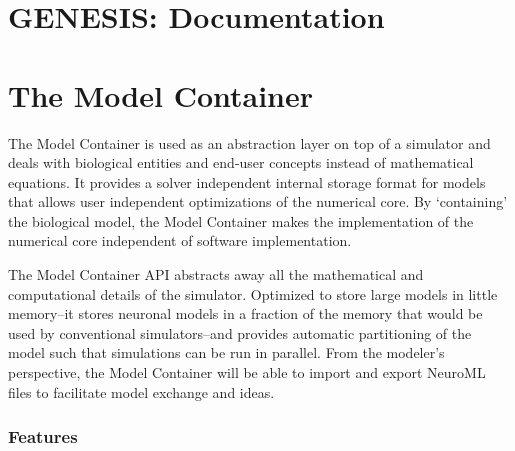 \documentclass[12pt]{article}
\begin{document}
\section*{GENESIS: Documentation}

\section*{The Model Container}

The Model Container is used as an abstraction layer on top of a simulator and deals with biological entities and end-user concepts instead of mathematical equations. It provides a solver independent internal storage format for models that allows user independent optimizations of the numerical core. By `containing' the biological model, the Model Container makes the implementation of the numerical core independent of software implementation.

The Model Container API abstracts away all the mathematical and computational details of the simulator. Optimized to store large models in little memory--it stores neuronal models in a fraction of the memory that would be used by conventional simulators--and provides automatic partitioning of the model such that simulations can be run in parallel. From the modeler's perspective, the Model Container will be able to import and export NeuroML files to facilitate model exchange and ideas.

\subsubsection*{Features}
\end{document}
